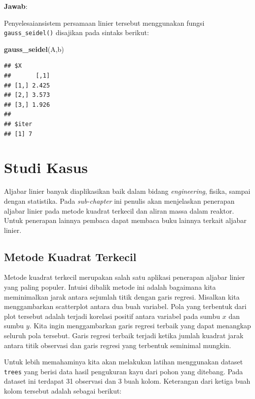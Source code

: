 \documentclass[
]{book}
\newenvironment{Shaded}{\begin{snugshade}}{\end{snugshade}}
\newcommand{\FunctionTok}[1]{\textcolor[rgb]{0.13,0.29,0.53}{\textbf{#1}}}
\newcommand{\NormalTok}[1]{#1}
\theoremstyle{definition}
\theoremstyle{definition}
\theoremstyle{definition}
\theoremstyle{definition}
\theoremstyle{remark}
\begin{document}
\textbf{Jawab}:

Penyelesaiansistem persamaan linier tersebut menggunakan fungsi \texttt{gauss\_seidel()} disajikan pada sintaks berikut:

\begin{Shaded}
\begin{Highlighting}[]
\FunctionTok{gauss\_seidel}\NormalTok{(A,b)}
\end{Highlighting}
\end{Shaded}

\begin{verbatim}
## $X
##       [,1]
## [1,] 2.425
## [2,] 3.573
## [3,] 1.926
## 
## $iter
## [1] 7
\end{verbatim}

\hypertarget{studikasus}{%
\section{Studi Kasus}\label{studikasus}}

Aljabar linier banyak diaplikasikan baik dalam bidang \emph{engineering}, fisika, sampai dengan statistika. Pada \emph{sub-chapter} ini penulis akan menjelaskan penerapan aljabar linier pada metode kuadrat terkecil dan aliran massa dalam reaktor. Untuk penerapan lainnya pembaca dapat membaca buku lainnya terkait aljabar linier.

\hypertarget{leastsquare}{%
\subsection{Metode Kuadrat Terkecil}\label{leastsquare}}

Metode kuadrat terkecil merupakan salah satu aplikasi penerapan aljabar linier yang paling populer. Intuisi dibalik metode ini adalah bagaimana kita meminimalkan jarak antara sejumlah titik dengan garis regresi. Misalkan kita menggambarkan scatterplot antara dua buah variabel. Pola yang terbentuk dari plot tersebut adalah terjadi korelasi positif antara variabel pada sumbu \(x\) dan sumbu \(y\). Kita ingin menggambarkan garis regresi terbaik yang dapat menangkap seluruh pola tersebut. Garis regresi terbaik terjadi ketika jumlah kuadrat jarak antara titik observasi dan garis regresi yang terbentuk seminimal mungkin.

Untuk lebih memahaminya kita akan melakukan latihan menggunakan dataset \texttt{trees} yang berisi data hasil pengukuran kayu dari pohon yang ditebang. Pada dataset ini terdapat 31 observasi dan 3 buah kolom. Keterangan dari ketiga buah kolom tersebut adalah sebagai berikut:
\end{document}
